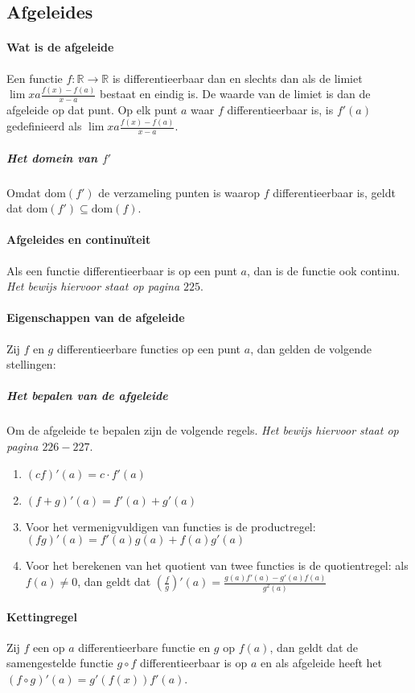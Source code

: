\subsection{Afgeleides}

\paragraph{Wat is de afgeleide} Een functie $f:\mathbb{R}\to\mathbb{R}$ is differentieerbaar dan en slechts dan als de limiet $\lim{x}{a}\frac{f(x)-f(a)}{x-a}$ bestaat en eindig is. De waarde van de limiet is dan de afgeleide op dat punt. Op elk punt $a$ waar $f$ differentieerbaar is, is $f'(a)$ gedefinieerd als $\lim{x}{a}\frac{f(x)-f(a)}{x-a}$.

\subparagraph{Het domein van $f'$} Omdat $\text{dom}(f')$ de verzameling punten is waarop $f$ differentieerbaar is, geldt dat $\text{dom}(f')\subseteq\text{dom}(f)$.

\paragraph{Afgeleides en continuïteit} Als een functie differentieerbaar is op een punt $a$, dan is de functie ook continu. \textit{Het bewijs hiervoor staat op pagina $225$}.

\paragraph{Eigenschappen van de afgeleide} Zij $f$ en $g$ differentieerbare functies op een punt $a$, dan gelden de volgende stellingen:

\subparagraph{Het bepalen van de afgeleide} Om de afgeleide te bepalen zijn de volgende regels. \textit{Het bewijs hiervoor staat op pagina $226-227$}.


\begin{enumerate}
  \setlength\itemsep{0em}
  \item $(cf)'(a)=c\cdot f'(a)$
  \item $(f+g)'(a)=f'(a)+g'(a)$
  \item Voor het vermenigvuldigen van functies is de productregel: $(fg)'(a)=f'(a)g(a)+f(a)g'(a)$
  \item Voor het berekenen van het quotient van twee functies is de quotientregel: als $f(a)\neq0$, dan geldt dat $(\frac{f}{g})'(a)=\frac{g(a)f'(a)-g'(a)f(a)}{g^{2}(a)}$
\end{enumerate}

\paragraph{Kettingregel} Zij $f$ een op $a$ differentieerbare functie en $g$ op $f(a)$, dan geldt dat de samengestelde functie $g\circ f$ differentieerbaar is op $a$ en als afgeleide heeft het $(f\circ g)'(a) = g'(f(x))f'(a)$.

